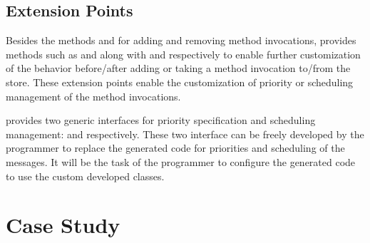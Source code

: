 


\subsection{Extension Points}

Besides the methods  and  for adding and removing method invocations,  provides methods such as  and  along with  and  respectively to enable  further customization of the behavior before/after adding or taking a method invocation to/from the store. These extension points enable the customization of priority or scheduling management of the method invocations.

\Crisp provides two generic interfaces for priority specification and scheduling management:  and  respectively. These two interface can be freely developed by the programmer to replace the generated code for priorities and scheduling of the messages. It will be the task of the programmer to configure the generated code to use the custom developed classes.

\section{Case Study} \label{sec:caseStudy}

